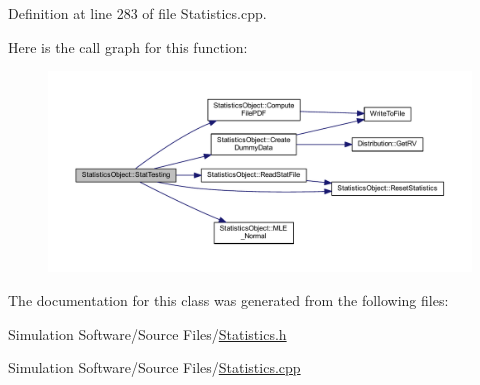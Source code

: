 Definition at line 283 of file Statistics.\+cpp.

Here is the call graph for this function\+:\nopagebreak
\begin{figure}[H]
\begin{center}
\leavevmode
\includegraphics[width=350pt]{class_statistics_object_a9545eace92c4a478cf20dba20f8e51bf_cgraph}
\end{center}
\end{figure}


The documentation for this class was generated from the following files\+:\begin{DoxyCompactItemize}
\item 
Simulation Software/\+Source Files/\hyperlink{_statistics_8h}{Statistics.\+h}\item 
Simulation Software/\+Source Files/\hyperlink{_statistics_8cpp}{Statistics.\+cpp}\end{DoxyCompactItemize}
